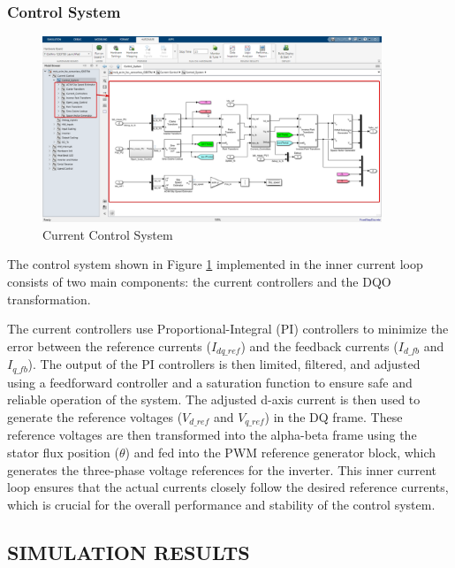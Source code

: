 \subsubsection{Control System}



\begin{figure}[H]
	\centering
	\includegraphics[width=4in]{sections/section3/images/simulation/currentControl/controlSystem.png}
	\caption{Current Control System}
	\label{fig:current_control_system}
\end{figure}


The control system shown in Figure \ref{fig:current_control_system} implemented in the inner current loop consists of two main components: the current controllers and the DQO transformation.

The current controllers use Proportional-Integral (PI) controllers to minimize the error between the reference currents ($I_{dq\_{ref}}$) and the feedback currents ($I_{d\_fb}$ and $I_{q\_fb}$). The output of the PI controllers is then limited, filtered, and adjusted using a feedforward controller and a saturation function to ensure safe and reliable operation of the system. The adjusted d-axis current is then used to generate the reference voltages ($V_{d\_{ref}}$ and $V_{q\_{ref}}$) in the DQ frame. These reference voltages are then transformed into the alpha-beta frame using the stator flux position ($\theta$) and fed into the PWM reference generator block, which generates the three-phase voltage references for the inverter. This inner current loop ensures that the actual currents closely follow the desired reference currents, which is crucial for the overall performance and stability of the control system.



\subsection{SIMULATION RESULTS}


